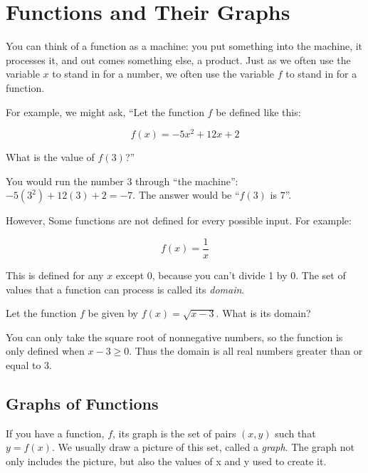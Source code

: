 \chapter{Functions and Their Graphs}

You can think of a function as a machine: you put something into the
machine, it processes it, and out comes something else, a product. Just as we
often use the variable $x$ to stand in for a number, we often use the
variable $f$ to stand in for a function.

For example, we might ask, ``Let the function $f$ be defined like this:

\begin{equation*}
f(x) = -5x^2 + 12x + 2
\end{equation*}

What is the value of $f(3)$?''

You would run the number 3 through ``the machine'': $-5(3^2) + 12(3) + 2 = -7$. The answer would be ``$f(3)$ is $7$''.

However, Some functions are not defined for every possible input. For example:

\begin{equation*}
  f(x) = \frac{1}{x}
\end{equation*}

  This is defined for any $x$ except 0, because you can't divide 1 by 0. The set of values that a function can process is called its \textit{domain}.

\begin{Exercise}[title={Domain of a function}, label=function_domain]

  Let the function $f$ be given by $f(x) = \sqrt{x - 3}$.  What is its domain?

\end{Exercise}
\begin{Answer}[ref=function_domain]
  You can only take the square root of nonnegative numbers, so the
  function is only defined when $x - 3 \geq 0$.  Thus the domain is
  all real numbers greater than or equal to 3.
\end{Answer}

\section{Graphs of Functions}

If you have a function, $f$, its graph is the set of pairs $(x, y)$
such that $y = f(x)$.  We usually draw a picture of this set, called a \textit{graph}. 
The graph not only includes the picture, but also the values of x and y used to create it.

